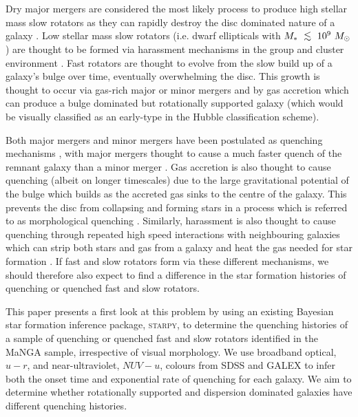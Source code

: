 \documentclass[useAMS,usenatbib]{mn2e}
\def\lesssim{\mathrel{\hbox{\rlap{\hbox{\lower3pt\hbox{$\sim$}}}\hbox{\raise2pt\hbox{$<$}}}}}
\begin{document}
Dry major mergers are considered the most likely process to produce high stellar mass slow rotators \citep{duc11, naab14} as they can rapidly destroy the disc dominated nature of a galaxy \citep{toomre72}. Low stellar mass slow rotators (i.e. dwarf ellipticals with $M_*~\lesssim~10^9~M_{\odot}$) are thought to be formed via harassment mechanisms in the group and cluster environment \citep{toloba15}. %
Fast rotators are thought to evolve from the slow build up of a galaxy's bulge over time, eventually overwhelming the disc. This growth is thought to occur via gas-rich major or minor mergers \citep{duc11} and by gas accretion \citep{cappellari13, johnston14} which can produce a bulge dominated but rotationally supported galaxy (which would be visually classified as an early-type in the Hubble classification scheme). %

Both major mergers and minor mergers have been postulated as quenching mechanisms \citep{hopkins08a, snyder11, hayward14}, with major mergers thought to cause a much faster quench of the remnant galaxy than a minor merger \citep{lotz08b, lotz11}. Gas accretion is also thought to cause quenching (albeit on longer timescales) due to the large gravitational potential of the bulge which builds as the accreted gas sinks to the centre of the galaxy. This prevents the disc from collapsing and forming stars in a process which is referred to as morphological quenching \citep{martig09, fang13}. Similarly, harassment is also thought to cause quenching through repeated high speed interactions with neighbouring galaxies which can strip both stars and gas from a galaxy and heat the gas needed for star formation \citep{knebe06, aguerri09}. If fast and slow rotators form via these different mechanisms, we should therefore also expect to find a difference in the star formation histories of quenching or quenched fast and slow rotators. 

This paper presents a first look at this problem by using an existing Bayesian star formation inference package, \textsc{starpy}, to determine the quenching histories of a sample of quenching or quenched fast and slow rotators identified in the MaNGA sample, irrespective of visual morphology. We use broadband optical, $u-r$, and near-ultraviolet, $NUV-u$, colours from SDSS and GALEX to infer both the onset time and exponential rate of quenching for each galaxy. We aim to determine whether rotationally supported and dispersion dominated galaxies have different quenching histories. 
\end{document}
